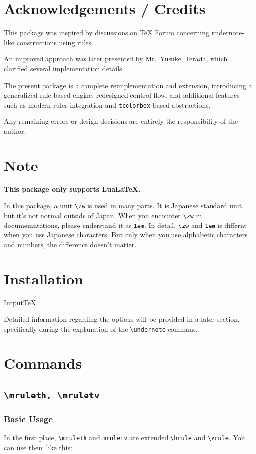 \documentclass[luatex,fontsize=8pt,paper=b5,twoside]{jlreq}%
\begin{document}
\section{Acknowledgements / Credits}
This package was inspired by discussions on TeX Forum concerning
undernote-like constructions using rules.

An improved approach was later presented by Mr.~Yusuke~Terada,
which clarified several implementation details.

The present package is a complete reimplementation and extension,
introducing a generalized rule-based engine, redesigned control flow,
and additional features such as modern ruler integration and
\texttt{tcolorbox}-based abstractions.

Any remaining errors or design decisions are entirely the
responsibility of the author.

\section{Note}
\textbf{This package only supports LuaLaTeX.}

In this package, a unit \verb|\zw| is used in many parts. It is Japanese standard unit, but it's not normal outside of Japan. When you encounter \verb|\zw| in documemntations, please understand it as \verb|1em|. In detail, \verb|\zw| and \verb|1em| is differnt when you use Japanese characters. But only when you use alphabetic characters and numbers, the difference doesn't matter. 

\section{Installation}
\begin{SourceCode}{Intput}{TeX}
  \usepackage[<options>]{modernruler}
\end{SourceCode}

Detailed information regarding the options will be provided in a later section, specifically during the explanation of the \verb|\undernote| command.

\section{Commands}
\subsection{\texttt{\textbackslash mruleth, \textbackslash mruletv}}
\subsubsection{Basic Usage}
In the first place, \verb|\mruleth| and \verb|mruletv| are extended \verb|\hrule| and \verb|\vrule|. You can use them like this:
\end{document}
